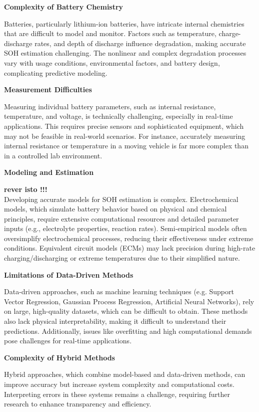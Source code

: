 \textbf{Complexity of Battery Chemistry}

Batteries, particularly lithium-ion batteries, have intricate internal chemistries that are difficult to model and monitor.
Factors such as temperature, charge-discharge rates, and depth of discharge influence degradation, making accurate SOH estimation challenging. 
The nonlinear and complex degradation processes vary with usage conditions, environmental factors, and battery design, complicating predictive modeling.

\textbf{Measurement Difficulties}

Measuring individual battery parameters, such as internal resistance, temperature, and voltage, is technically challenging, especially in real-time applications. 
This requires precise sensors and sophisticated equipment, which may not be feasible in real-world scenarios. 
For instance, accurately measuring internal resistance or temperature in a moving vehicle is far more complex than in a controlled lab environment.

\textbf{Modeling and Estimation}

\textbf{rever isto !!!} \\
Developing accurate models for SOH estimation is complex. 
Electrochemical models, which simulate battery behavior based on physical and chemical principles, require extensive computational resources and detailed parameter inputs (e.g., electrolyte properties, reaction rates). 
Semi-empirical models often oversimplify electrochemical processes, reducing their effectiveness under extreme conditions. Equivalent circuit models (ECMs) may lack precision during high-rate charging/discharging or extreme temperatures due to their simplified nature.

\textbf{Limitations of Data-Driven Methods}

Data-driven approaches, such as machine learning techniques (e.g. Support Vector Regression, Gaussian Process Regression, Artificial Neural Networks), rely on large, high-quality datasets, which can be difficult to obtain. 
These methods also lack physical interpretability, making it difficult to understand their predictions. 
Additionally, issues like overfitting and high computational demands pose challenges for real-time applications.

\textbf{Complexity of Hybrid Methods}

Hybrid approaches, which combine model-based and data-driven methods, can improve accuracy but increase system complexity and computational costs. 
Interpreting errors in these systems remains a challenge, requiring further research to enhance transparency and efficiency.

